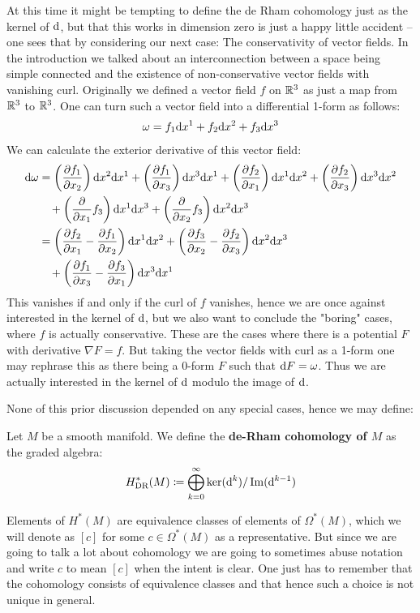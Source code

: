 At this time it might be tempting to define the de Rham cohomology just as the kernel of $\rmd$, but that this
works in dimension zero is just a happy little accident – one sees that by considering our next case: The
conservativity of vector fields. In the introduction we talked about an interconnection between a space being
simple connected and the existence of non-conservative vector fields with vanishing curl. Originally we defined a
vector field $f$ on $\RR^3$ as just a map from $\RR^3$ to $\RR^3$. One can turn such a vector field into a
differential 1-form as follows:
\begin{align*}
	\omega = f_1 \dx{1} + f_2 \dx{2} + f_3 \dx{3}
\end{align*}
We can calculate the exterior derivative of this vector field:
\begin{align*}
	\rmd \omega &=
		  \left(\pdx[f_1]{2} \right) \dx{2}\dx{1}
		+ \left(\pdx[f_1]{3} \right) \dx{3}\dx{1}
		+ \left(\pdx[f_2]{1} \right) \dx{1}\dx{2}
		+ \left(\pdx[f_2]{3} \right) \dx{3}\dx{2} \\
		&\phantom{=}\,+ \left(\pdx{1} f_3\right) \dx{1}\dx{3}
		+ \left(\pdx{2} f_3\right) \dx{2}\dx{3} \\
		&= \left( \pdx[f_2]{1} - \pdx[f_1]{2} \right) \dx{1}\dx{2}
			+ \left( \pdx[f_3]{2} - \pdx[f_2]{3} \right) \dx{2}\dx{3} \\
		&\phantom{=}\,+ \left( \pdx[f_1]{3} - \pdx[f_3]{1} \right) \dx{3}\dx{1}
\end{align*}
This vanishes if and only if the curl of $f$ vanishes, hence we are once against interested in the kernel of $\rmd$,
but we also want to conclude the "boring" cases, where $f$ is actually conservative. These are the cases where
there is a potential $F$ with derivative $\nabla F = f$. But taking the vector fields with curl as a 1-form one
may rephrase this as there being a 0-form $F$ such that $\rmd F = \omega$.  Thus we are actually interested in
the kernel of $\rmd$ modulo the image of $\rmd$.

None of this prior discussion depended on any special cases, hence we may define:
\begin{definition}
Let $M$ be a smooth manifold. We define the \textbf{de-Rham cohomology of $M$} as the graded
algebra:
\[
	H^*_\dr(M) \coloneqq \bigoplus_{k = 0}^\infty \ker(\mathrm{d}^k)/\Img(\mathrm{d}^{k - 1})
\]
\end{definition}
\begin{remark}
Elements of $H^*(M)$ are equivalence classes of elements of $\Omega^*(M)$, which we will
denote as $[c]$ for some $c \in \Omega^*(M)$ as a representative. But since we are going to
talk a lot about cohomology we are going to sometimes abuse notation and write $c$ to mean $[c]$
when the intent is clear. One just has to remember that the cohomology consists of equivalence classes
and that hence such a choice is not unique in general.
\end{remark}

